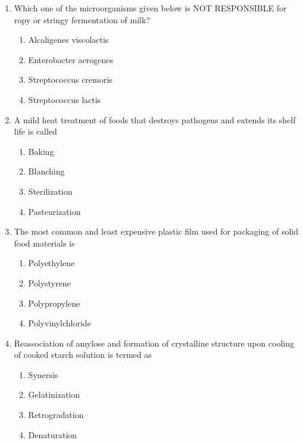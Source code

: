 \documentclass[journal,12pt,onecolumn]{IEEEtran}
\begin{document}
\begin{enumerate}[label=\arabic*.]
\item Which one of the microorganisms given below is NOT RESPONSIBLE for ropy or stringy fermentation of milk?
\begin{multicols}{2}
\begin{enumerate}[label=(\Alph*)]
\item Alcaligenes viscolactis
\item Enterobacter aerogenes
\item Streptococcus cremoris
\item Streptococcus lactis
\end{enumerate}
\end{multicols}

\item A mild heat treatment of foods that destroys pathogens and extends its shelf life is called
\begin{multicols}{4}
\begin{enumerate}[label=(\Alph*)]
\item Baking
\item Blanching
\item Sterilization
\item Pasteurization
\end{enumerate}
\end{multicols}

\item The most common and least expensive plastic film used for packaging of solid food materials is
\begin{multicols}{4}
\begin{enumerate}[label=(\Alph*)]
\item Polyethylene
\item Polystyrene
\item Polypropylene
\item Polyvinylchloride
\end{enumerate}
\end{multicols}

\item Reassociation of amylose and formation of crystalline structure upon cooling of cooked starch solution is termed as
\begin{multicols}{4}
\begin{enumerate}[label=(\Alph*)]
\item Synersis
\item Gelatinization
\item Retrogradation
\item Denaturation
\end{enumerate}
\end{multicols}


\end{enumerate}
\end{document}
